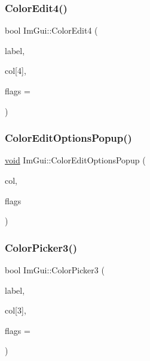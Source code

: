 \mbox{\label{namespaceImGui_ac3f45e2aa0b1d591cc8a2cdf8b566a45}} 
\subsubsection{\texorpdfstring{Color\+Edit4()}{ColorEdit4()}}
{\footnotesize\ttfamily bool Im\+Gui\+::\+Color\+Edit4 (\begin{DoxyParamCaption}\item[{const char $\ast$}]{label,  }\item[{float}]{col\mbox{[}4\mbox{]},  }\item[{Im\+Gui\+Color\+Edit\+Flags}]{flags = {} }\end{DoxyParamCaption})}

\mbox{\label{namespaceImGui_a6bfb117816d669f8704e5d0c0c0795fe}} 
\subsubsection{\texorpdfstring{Color\+Edit\+Options\+Popup()}{ColorEditOptionsPopup()}}
{\footnotesize\ttfamily \hyperlink{imgui__impl__opengl3__loader_8h_ac668e7cffd9e2e9cfee428b9b2f34fa7}{void} Im\+Gui\+::\+Color\+Edit\+Options\+Popup (\begin{DoxyParamCaption}\item[{const float $\ast$}]{col,  }\item[{Im\+Gui\+Color\+Edit\+Flags}]{flags }\end{DoxyParamCaption})}

\mbox{\label{namespaceImGui_a2a2a98cb9a17b18702be6b954670b388}} 
\subsubsection{\texorpdfstring{Color\+Picker3()}{ColorPicker3()}}
{\footnotesize\ttfamily bool Im\+Gui\+::\+Color\+Picker3 (\begin{DoxyParamCaption}\item[{const char $\ast$}]{label,  }\item[{float}]{col\mbox{[}3\mbox{]},  }\item[{Im\+Gui\+Color\+Edit\+Flags}]{flags = {} }\end{DoxyParamCaption})}

